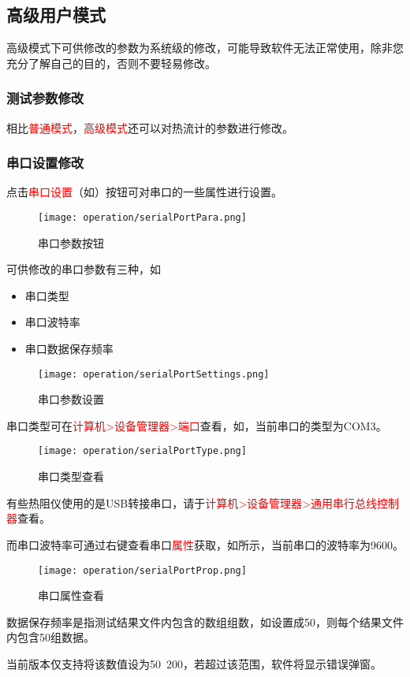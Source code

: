 \subsection{高级用户模式\label{subsec:advancedUser}}
\begin{note}
    高级模式下可供修改的参数为系统级的修改，可能导致软件无法正常使用，除非您充分了解自己的目的，否则不要轻易修改。
\end{note}
\subsubsection*{测试参数修改}
相比\textcolor{red}{普通模式}，\textcolor{red}{高级模式}还可以对热流计的参数进行修改。
\subsubsection*{串口设置修改}
点击\textcolor{red}{串口设置}（如）按钮可对串口的一些属性进行设置。
\begin{figure}[H]
    \centering
    \texttt{[image: operation/serialPortPara.png]}
    \caption{  串口参数按钮 \label{fig:btnSerialPortPara}}
\end{figure}
可供修改的串口参数有三种，如
\begin{itemize}
    \item 串口类型
    \item 串口波特率
    \item 串口数据保存频率
\end{itemize}
\begin{figure}[H]
    \centering
    \texttt{[image: operation/serialPortSettings.png]}
    \caption{  串口参数设置 \label{fig:serialPortSetting}}
\end{figure}
串口类型可在\textcolor{red}{计算机>设备管理器>端口}查看，如，当前串口的类型为COM3。
\begin{figure}[H]
    \centering
    \texttt{[image: operation/serialPortType.png]}
    \caption{  串口类型查看 \label{fig:serialPortType}}
\end{figure}
\begin{note}
    有些热阻仪使用的是USB转接串口，请于\textcolor{red}{计算机>设备管理器>通用串行总线控制器}查看。
\end{note}
而串口波特率可通过右键查看串口\textcolor{red}{属性}获取，如所示，当前串口的波特率为9600。
\begin{figure}[H]
    \centering
    \texttt{[image: operation/serialPortProp.png]}
    \caption{  串口属性查看 \label{fig:serialPortProp}}
\end{figure}
数据保存频率是指测试结果文件内包含的数组组数，如设置成50，则每个结果文件内包含50组数据。
\begin{note}
    当前版本仅支持将该数值设为50~200，若超过该范围，软件将显示错误弹窗。
\end{note}

